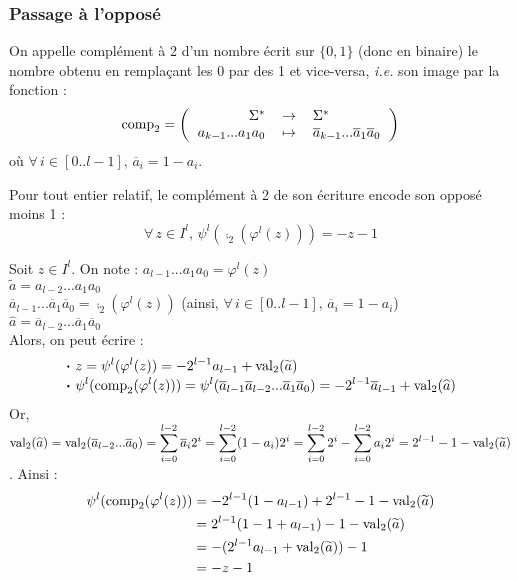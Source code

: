 		\subsubsection{Passage à l'opposé}
			
			\begin{Definition}[complément à 2]
				On appelle complément à 2 d'un nombre écrit sur \(\{0,1\}\) (donc en binaire) le nombre obtenu en remplaçant les 0 par des 1 et vice-versa, \emph{i.e.} son image par la fonction :
					\[
						\comp_2 = \fun{\Sigma^*}{\Sigma^*}{a_{k-1}...a_1a_0}{\overline{a}_{k-1}...{\overline{a}_1}{\overline{a}_0}}
					\]
				où \(\forall\,i\in[0..l-1],\,\overline{a}_i = 1-a_i\).
			\end{Definition}
			
			\eqskip{1mm}
			\begin{Propriete}
				Pour tout entier relatif, le complément à 2 de son écriture encode son opposé moins 1 :
				\[\forall\,z\in I^l,\,\psi^l(\comp_2(\varphi^l(z))) = -z-1\]
			\end{Propriete}
			
			\eqskip{1mm}
				\begin{Preuve}
					Soit \(z\in I^l\). On note :
					\bdot \(a_{l-1}...a_1a_0 = \varphi^l(z)\) \\
					 \bdot \(\widetilde{a} = a_{l-2}...a_1a_0\) \\
					 \bdot \(\overline{a}_{l-1}...\overline{a}_1\overline{a}_0 = \comp_2(\varphi^l(z))\)  (ainsi, \(\forall\,i\in[0..l-1],\,\overline{a}_i = 1-a_i\)) \\
					 \bdot \(\widehat{a} = \overline{a}_{l-2}...\overline{a}_1\overline{a}_0\) \\
					Alors, on peut écrire :
						\begin{align*}
							& \text{\(\bm{\cdot}\) } z = \psi^l(\varphi^l(z)) = -2^{l-1}a_{l-1} + \operatorname{val}_2(\widetilde{a}) \\[-1mm] & \text{\(\bm{\cdot}\) } \psi^l(\operatorname{comp}_2(\varphi^l(z))) = \psi^l(\overline{a}_{l-1}\overline{a}_{l-2}...\overline{a}_1\overline{a}_0) = -2^{l-1}\overline{a}_{l-1} + \operatorname{val}_2(\widehat{a})
						\end{align*}
					Or, \(\displaystyle
							\operatorname{val}_2(\widehat{a}) = \operatorname{val}_2(\overline{a}_{l-2}...\overline{a}_0) = \sum_{i=0}^{l-2} \overline{a}_i2^i = \sum_{i=0}^{l-2} (1-a_i)2^i = \sum_{i=0}^{l-2} 2^i - \sum_{i=0}^{l-2} a_i2^i = 2^{l-1}-1-\operatorname{val}_2(\widetilde{a})
						\). \nt
					\eqskip{-5mm}
					Ainsi :
						\begin{align*}
							\psi^l(\operatorname{comp}_2(\varphi^l(z))) & = -2^{l-1}(1-a_{l-1}) + 2^{l-1}-1-\operatorname{val}_2(\widetilde{a}) \\
							& = 2^{l-1}(1-1+a_{l-1})-1-\operatorname{val}_2(\widetilde{a}) \\
							& = -(2^{l-1}a_{l-1} + \operatorname{val}_2(\widetilde{a})) - 1 \\
							& = -z-1
						\end{align*}
				\end{Preuve}
				
